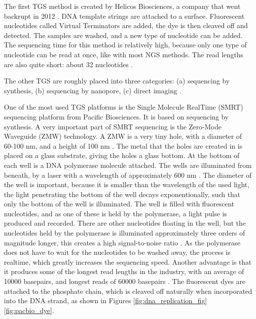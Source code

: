 \documentclass[../main/thesis.tex]{subfiles}
\begin{document}
The first TGS method is created by Helicos Biosciences, a company that went backrupt in 2012 \cite{history_sequencing}.
DNA template strings are attached to a surface.
Fluorescent nucleotides called Virtual Terminators are added, the dye is then cleaved off and detected.
The samples are washed, and a new type of nucleotide can be added.
The sequencing time for this method is relatively high, because only one type of nucleotide can be read at once, like with most NGS methods.
The read lengths are also quite short: about 32 nucleotides \cite{window_tgs}.

The other TGS are roughly placed into three categories: (a) sequencing by synthesis, (b) sequencing by nanopore, (c) direct imaging \cite{window_tgs}.

One of the most used TGS platforms is the Single Molecule RealTime (SMRT) sequencing platform from Pacific Biosciences.
It is based on sequencing by synthesis.
A very important part of SMRT sequencing is the Zero-Mode Waveguide (ZMW) technology.
A ZMW is a very tiny hole, with a diameter of 60-100 nm, and a height of 100 nm \cite{zmw}.
The metal that the holes are created in is placed on a glass substrate, giving the holes a glass bottom.
At the bottom of each well is a DNA polymerase molecule attached.
The wells are illuminated from beneath, by a laser with a wavelength of approximately 600 nm \cite{history_sequencing}.
The diameter of the well is important, because it is smaller than the wavelength of the used light, the light penetrating the bottom of the well decays exponentionally, such that only the bottom of the well is illuminated.
The well is filled with fluorescent nucleotides, and as one of these is held by the polymerase, a light pulse is produced and recorded.
There are other nucleotides floating in the well, but the nucleotides held by the polymerase is illuminated approximately three orders of magnitude longer, this creates a high signal-to-noise ratio \cite{window_tgs}.
As the polymerase does not have to wait for the nucleotides to be washed away, the process is realtime, which greatly increases the sequencing speed.
Another advantage is that it produces some of the longest read lengths in the industry, with an average of 10000 basepairs, and longest reads of 60000 basepairs \cite{pacbio_readlength}.
The fluorescent dyes are attached to the phosphate chain, which is cleaved off naturally when incorporated into the DNA strand, as shown in Figures \ref{fig:dna_replication_fig} \ref{fig:pacbio_dye}.

\end{document}
